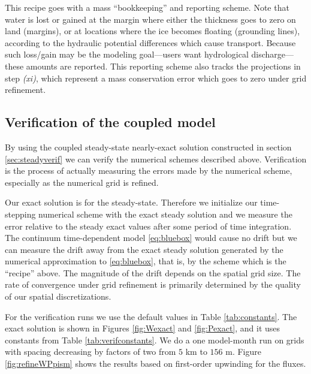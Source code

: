 \documentclass[11pt,final]{amsart}
\begin{document}
\medskip
This recipe goes with a mass ``bookkeeping'' and reporting scheme.  Note that water is lost or gained at the margin where either the thickness goes to zero on land (margins), or at locations where the ice becomes floating (grounding lines), according to the hydraulic potential differences which cause transport.  Because such loss/gain may be the modeling goal---users want hydrological discharge---these amounts are reported.  This reporting scheme also tracks the projections in step \emph{(xi)}, which represent a mass conservation error which goes to zero under grid refinement.

\subsection*{Verification of the coupled model}  By using the coupled steady-state nearly-exact solution constructed in section \ref{sec:steadyverif} we can verify the numerical schemes described above.  Verification is the process of actually measuring the errors made by the numerical scheme, especially as the numerical grid is refined.

Our exact solution is for the steady-state.  Therefore we initialize our time-stepping numerical scheme with the exact steady solution and we measure the error relative to the steady exact values after some period of time integration.  The continuum time-dependent model \eqref{eq:bluebox} would cause no drift but we can measure the drift away from the exact steady solution generated by the numerical approximation to \eqref{eq:bluebox}, that is, by the scheme which is the ``recipe'' above.  The magnitude of the drift depends on the spatial grid size.  The rate of convergence under grid refinement is primarily determined by the quality of our spatial discretizations.

For the verification runs we use the default values in Table \ref{tab:constants}.  The exact solution is shown in Figures \ref{fig:Wexact} and \ref{fig:Pexact}, and it uses constants from Table \ref{tab:verifconstants}.  We do a one model-month run on grids with spacing decreasing by factors of two from $5$ km to $156$ m.  Figure \ref{fig:refineWPpism} shows the results based on first-order upwinding for the fluxes.
\end{document}
